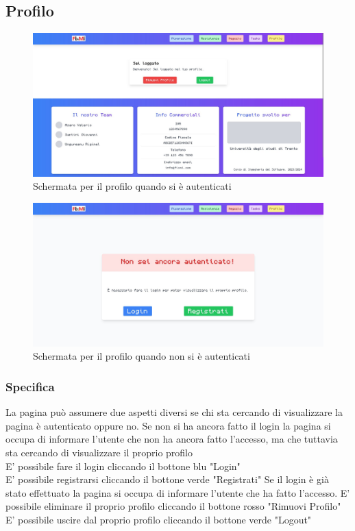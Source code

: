 \documentclass{report}
\begin{document}
\subsection{Profilo}

\begin{figure}[H]
	\centering\includegraphics[width=1\textwidth]{images/microservizio-autenticazione/frontend/profilo.jpg}
	\caption{Schermata per il profilo quando si è autenticati}
\end{figure}
\begin{figure}[H]
	\centering\includegraphics[width=1\textwidth]{images/microservizio-autenticazione/frontend/nonautenticato.jpg}
	\caption{Schermata per il profilo quando non si è autenticati}
\end{figure}
\subsubsection*{Specifica}
La pagina può assumere due aspetti diversi se chi sta cercando di visualizzare la pagina è autenticato oppure no.
Se non si ha ancora fatto il login la pagina si occupa di informare l'utente che non ha ancora fatto l'accesso, ma che tuttavia sta cercando di visualizzare il proprio profilo\\
E' possibile fare il login cliccando il bottone blu "Login"\\
E' possibile registrarsi cliccando il bottone verde "Registrati"
Se il login è già stato effettuato la pagina si occupa di informare l'utente che ha fatto l'accesso.
E' possibile eliminare il proprio profilo cliccando il bottone rosso "Rimuovi Profilo"\\
E' possibile uscire dal proprio profilo cliccando il bottone verde "Logout"
\end{document}
